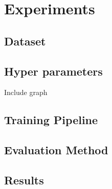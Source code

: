 \chapter{Experiments}\label{chap:experiments}


\section{Dataset} \label{section:experiments-dataset}

\section{Hyper parameters} \label{section:experiments-hyperparameters}
Include graph

\section{Training Pipeline} \label{section:experiments-trainingpipeline}

\section{Evaluation Method} \label{section:experiments-evaluationmethod}

\section{Results} \label{section:experiments-results}
